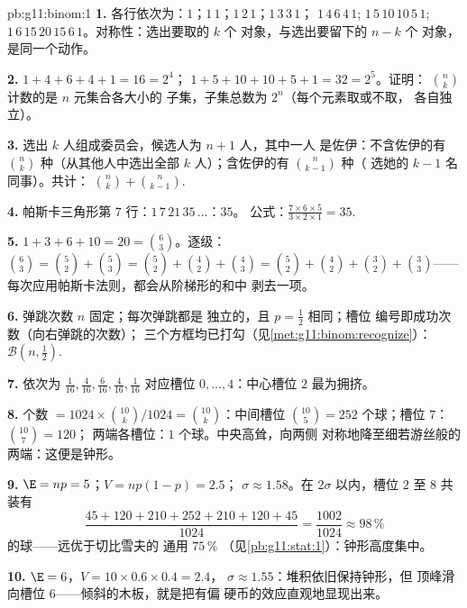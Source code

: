 \begin{solution}{pb:g11:binom:1}
\textbf{1.} 各行依次为：$1$；$1\,1$；$1\,2\,1$；$1\,3\,3\,1$；
$1\,4\,6\,4\,1$; $1\,5\,10\,10\,5\,1$;
$1\,6\,15\,20\,15\,6\,1$。对称性：选出要取的 $k$ 个
对象，与选出要留下的 $n - k$ 个
对象，是同一个动作。

\textbf{2.} $1 + 4 + 6 + 4 + 1 = 16 = 2^4$；
$1 + 5 + 10 + 10 + 5 + 1 = 32 = 2^5$。证明：
$\binom nk$ 计数的是 $n$ 元集合各大小的
子集，子集总数为 $2^n$（每个元素取或不取，
各自独立）。

\textbf{3.} 选出 $k$ 人组成委员会，候选人为 $n + 1$ 人，其中一人
是佐伊：不含佐伊的有 $\binom nk$ 种（从其他人中选出全部
$k$ 人）；含佐伊的有 $\binom{n}{k-1}$ 种（
选她的 $k - 1$ 名同事）。共计：
$\binom nk + \binom{n}{k-1}$.

\textbf{4.} 帕斯卡三角形第 $7$ 行：$1\,7\,21\,35\,\dots$：$35$。
公式：$\frac{7 \times 6 \times 5}{3 \times 2 \times 1} =
35$.

\textbf{5.} $1 + 3 + 6 + 10 = 20 = \binom63$。逐级：
$\binom63 = \binom52 + \binom53 = \binom52 + \binom42 +
\binom43 = \binom52 + \binom42 + \binom32 + \binom33$——
每次应用帕斯卡法则，都会从阶梯形的和中
剥去一项。

\textbf{6.} 弹跳次数 $n$ 固定；每次弹跳都是
独立的，且 $p = \frac12$ 相同；槽位
编号即成功次数（向右弹跳的次数）；
三个方框均已打勾（见\cref{met:g11:binom:recognize}）：
$\mathcal B\!\left(n, \frac12\right)$.

\textbf{7.} 依次为 $\frac{1}{16}, \frac{4}{16},
\frac{6}{16}, \frac{4}{16}, \frac{1}{16}$ 对应槽位
$0, \dots, 4$：中心槽位 $2$ 最为拥挤。

\textbf{8.} 个数 $= 1024 \times
\binom{10}{k}/1024 = \binom{10}{k}$：中间槽位
$\binom{10}{5} = 252$ 个球；槽位 $7$：$\binom{10}{7} = 120$；
两端各槽位：$1$ 个球。中央高耸，向两侧
对称地降至细若游丝般的两端：这便是钟形。

\textbf{9.} $\E = np = 5$；$V = np(1 - p) = 2.5$；
$\sigma \approx 1.58$。在 $2\sigma$ 以内，槽位 $2$ 至 $8$
共装有
\[
\frac{45 + 120 + 210 + 252 + 210 + 120 + 45}{1024}
= \frac{1002}{1024} \approx 98\,\%
\]
的球——远优于切比雪夫的
通用 $75\,\%$
（见\cref{pb:g11:stat:1}）：钟形高度集中。

\textbf{10.} $\E = 6$，$V = 10 \times 0.6 \times 0.4 = 2.4$，
$\sigma \approx 1.55$：堆积依旧保持钟形，但
顶峰滑向槽位 $6$——倾斜的木板，就是把有偏
硬币的效应直观地显现出来。


\end{solution}
